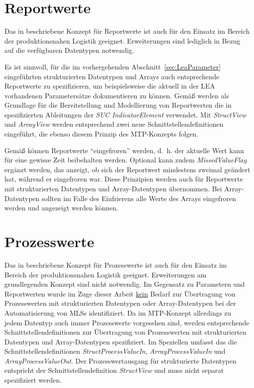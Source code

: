 \section{Reportwerte}
\label{sec:Reportwerte}

Das in \cite{PNO.2025.Part4} beschriebene Konzept für Reportwerte ist auch für den Einsatz im Bereich der produktionsnahen Logistik geeignet. Erweiterungen sind lediglich in Bezug auf die verfügbaren Datentypen notwendig. 

Es ist sinnvoll, für die im vorhergehenden Abschnitt~\ref{sec:LeaParameter} eingeführten strukturierten Datentypen und Arrays auch entsprechende Reportwerte zu spezifizieren, um beispielsweise die aktuell in der LEA vorhandenen Parametersätze dokumentieren zu können. Gemäß \cite{PNO.2025.Part4} werden als Grundlage für die Bereitstellung und Modellierung von Reportwerten die in \cite{PNO.2025.Part3} spezifizierten Ableitungen der \emph{SUC IndicatorElement} verwendet. Mit \emph{StructView} und \emph{ArrayView} werden entsprechend zwei neue Schnittstellendefinitionen eingeführt, die ebenso diesem Prinzip des MTP-Konzepts folgen. 

Gemäß \cite{PNO.2025.Part4} können Reportwerte \enquote{eingefroren} werden, d.~h. der aktuelle Wert kann für eine gewisse Zeit beibehalten werden. Optional kann zudem \emph{MissedValueFlag} ergänzt werden, das anzeigt, ob sich der Reportwert mindestens zweimal geändert hat, während er eingefroren war. Diese Prinzipien werden auch für Reportwerte mit strukturierten Datentypen und Array-Datentypen übernommen. Bei Array-Datentypen sollten im Falle des Einfrierens alle Werte des Arrays eingefroren werden und angezeigt werden können.

\section{Prozesswerte}
\label{sec:Prozesswerte}

Das in \cite{PNO.2025.Part4} beschriebene Konzept für Prozesswerte ist auch für den Einsatz im Bereich der produktionsnahen Logistik geeignet. Erweiterungen am grundlegenden Konzept sind nicht notwendig. Im Gegensatz zu Parametern und Reportwerten wurde im Zuge dieser Arbeit \underline{kein} Bedarf zur Übertragung von Prozesswerten mit strukturierten Datentypen oder Array-Datentypen bei der Automatisierung von MLSs identifiziert. Da im MTP-Konzept allerdings zu jedem Datentyp auch immer Prozesswerte vorgesehen sind, werden entsprechende Schnittstellendefinitionen zur Übertragung von Prozesswerten mit strukturierten Datentypen und Array-Datentypen spezifiziert. Im Speziellen umfasst das die Schnittstellendefinitionen \emph{StructProcessValueIn}, \emph{ArrayProcessValueIn} und \emph{ArrayProcessValueOut}. Der Prozesswertausgang für strukturierte Datentypen entspricht der Schnittstellendefinition \emph{StructView} und muss nicht separat spezifiziert werden.

